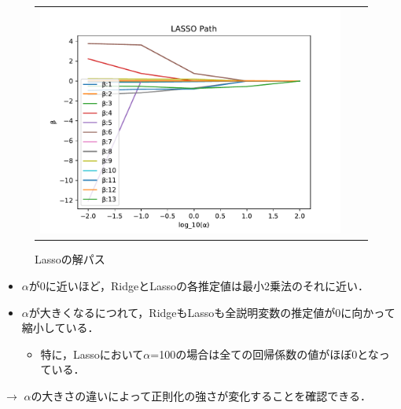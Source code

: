 \documentclass[dvipdfmx, 10pt]{beamer}
\begin{document}
\begin{frame}{\insertsubsection}
\begin{figure}[H]
\begin{tabular}{ccc}
\begin{minipage}{0.33\hsize}
            		 \caption{Ridgeの解パス}
            		 \label{fig:ridge}
            	 \end{minipage}
            	 \begin{minipage}{0.33\hsize}
                   	 \includegraphics[width=1.0\linewidth]{../img/lassoPath.pdf}
            		 \caption{Lassoの解パス}
            		 \label{fig:lasso}
            	 \end{minipage}
    	     \end{tabular}
    \end{figure}
    \begin{itemize}
        \item $\alpha$が0に近いほど，RidgeとLassoの各推定値は最小2乗法のそれに近い．
        \item $\alpha$が大きくなるにつれて，RidgeもLassoも全説明変数の推定値が0に向かって縮小している．
         \begin{itemize}
            \item 特に，Lassoにおいて$\alpha$=100の場合は全ての回帰係数の値がほぼ0となっている．
         \end{itemize}
    \end{itemize}
    $\rightarrow$ $\alpha$の大きさの違いによって正則化の強さが変化することを確認できる．
\end{frame}
\end{document}
